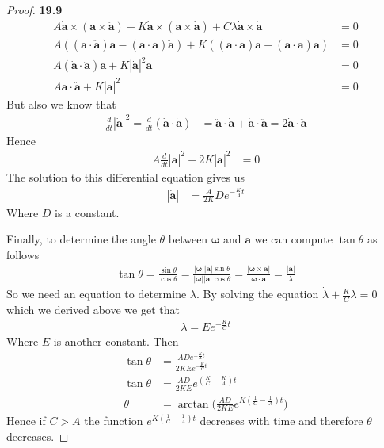\documentclass[11pt]{article}
\theoremstyle{definition}
\begin{document}
\begin{proof}{\textbf{19.9}}
    \begin{align*}
        A\bm{\dot a}\times(\bm{a}\times\bm{\ddot a})
        + K\bm{\dot a}\times(\bm{a}\times\bm{\dot a})
        + C\lambda\bm{\dot a}\times\bm{\dot a}
        &= 0\\
        A((\bm{\dot a} \cdot \bm{\ddot a})\bm{a} - (\bm{\dot a} \cdot \bm{a})\bm{\ddot a}) 
        + K((\bm{\dot a} \cdot \bm{\dot a})\bm{a} - (\bm{\dot a} \cdot \bm{a})\bm{a})
        &= 0\\
        A(\bm{\dot a} \cdot \bm{\ddot a})\bm{a} + K|\bm{\dot a}|^2\bm{a} &= 0\\
        A\bm{\dot a} \cdot \bm{\ddot a} + K|\bm{\dot a}|^2 &= 0
    \end{align*}
    But also we know that
    \begin{align*}
        \frac{d}{dt}|\bm{\dot a}|^2
        = \frac{d}{dt}(\bm{\dot a} \cdot \bm{\dot a})
        &= \bm{\ddot a} \cdot \bm{\dot a} + \bm{\dot a} \cdot \bm{\ddot a}
        = 2\bm{\dot a} \cdot \bm{\ddot a}
    \end{align*}
    Hence
    \begin{align*}
        A\frac{d}{dt}|\bm{\dot a}|^2 + 2K|\bm{\dot a}|^2 &= 0
    \end{align*}
    The solution to this differential equation gives us
    \begin{align*}
        |\bm{\dot a}| &= \frac{A}{2K}De^{-\frac{K}{A}t}
    \end{align*}
    Where $D$ is a constant.

    Finally, to determine the angle $\theta$ between $\bm\omega$ and $\bm{a}$
    we can compute $\tan\theta$ as follows
    \begin{align*}
        \tan\theta
        = \frac{\sin\theta}{\cos\theta}
        = \frac{|\bm{\omega}||\bm{a}|\sin\theta}{|\bm{\omega}||\bm{a}|\cos\theta}
        = \frac{|\bm{\omega}\times \bm{a}|}{\bm{\omega}\cdot\bm{a}}
        = \frac{|\bm{\dot a}|}{\lambda}
    \end{align*}
    So we need an equation to determine $\lambda$. By solving the equation
    $\dot\lambda + \frac{K}{C}\lambda = 0$ which we derived above we get that
    \begin{align*}
        \lambda = Ee^{-\frac{K}{C}t}    
    \end{align*}
    Where $E$ is another constant.
    Then
    \begin{align*}
        \tan\theta
        &= \frac{ADe^{-\frac{K}{A}t}}{2KEe^{-\frac{K}{C}t}}\\
        \tan\theta
        &= \frac{AD}{2KE}e^{(\frac{K}{C}-\frac{K}{A})t}\\
        \theta
        &= \arctan\bigg(\frac{AD}{2KE}e^{K(\frac{1}{C}-\frac{1}{A})t}\bigg)
    \end{align*}
    Hence if $C > A$ the function $e^{K(\frac{1}{C}-\frac{1}{A})t}$ decreases
    with time and therefore $\theta$ decreases.
\end{proof}
\end{document}
